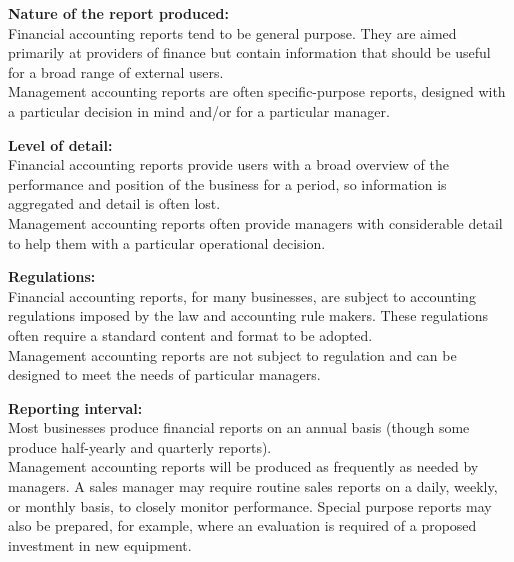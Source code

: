 \documentclass{report}
\newenvironment{blackbox}[1][Black]
  {\begin{tcolorbox}[colframe=#1,colback=white]}
  {\end{tcolorbox}}
\begin{document}
\begin{blackbox}
    \textbf{Nature of the report produced:}\\
    Financial accounting reports tend to be general purpose. They are aimed primarily at providers of finance but contain information that should be useful for a broad range of external users.\\
    Management accounting reports are often specific-purpose reports, designed with a particular decision in mind and/or for a particular manager.
\end{blackbox}

\begin{blackbox}
    \textbf{Level of detail:}\\
    Financial accounting reports provide users with a broad overview of the performance and position of the business for a period, so information is aggregated and detail is often lost.\\
    Management accounting reports often provide managers with considerable detail to help them with a particular operational decision.
\end{blackbox}

\begin{blackbox}
    \textbf{Regulations:}\\
    Financial accounting reports, for many businesses, are subject to accounting regulations imposed by the law and accounting rule makers. These regulations often require a standard content and format to be adopted.\\
    Management accounting reports are not subject to regulation and can be designed to meet the needs of particular managers.
\end{blackbox}

\begin{blackbox}
    \textbf{Reporting interval:}\\
    Most businesses produce financial reports on an annual basis (though some produce half-yearly and quarterly reports).\\
    Management accounting reports will be produced as frequently as needed by managers. A sales manager may require routine sales reports on a daily, weekly, or monthly basis, to closely monitor performance. Special purpose reports may also be prepared, for example, where an evaluation is required of a proposed investment in new equipment.
\end{blackbox}
\end{document}

